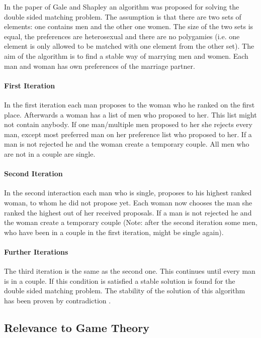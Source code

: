 In the paper of Gale and Shapley \cite{gale62a} an algorithm was proposed for solving the double sided matching problem.
The assumption is that there are two sets of elements: one contains men and the other one women.
The size of the two sets is equal, the preferences are heterosexual and there are no polygamies (i.e. one element is only allowed to be matched with one element from the other set).
The aim of the algorithm is to find a stable way of marrying men and women.
Each man and woman has own preferences of the marriage partner.

\paragraph{First Iteration\\}
In the first iteration each man proposes to the woman who he ranked on the first place.
Afterwards a woman has a list of men who proposed to her. This list might not contain anybody. 
If one man/multiple men proposed to her she rejects every man, except most preferred man on her preference list who proposed to her.
If a man is not rejected he and the woman create a temporary couple.
All men who are not in a couple are single.

\paragraph{Second Iteration\\}
In the second interaction each man who is single, proposes to his highest ranked woman, to whom he did not propose yet.
Each woman now chooses the man she ranked the highest out of her received proposals.
If a man is not rejected he and the woman create a temporary couple (Note: after the second iteration some men, who have been in a couple in the first iteration, might be single again).

\paragraph{Further Iterations\\}
The third iteration is the same as the second one.
This continues until every man is in a couple.
If this condition is satisfied a stable solution is found for the double sided matching problem.
The stability of the solution of this algorithm has been proven by contradiction \cite{gale62a}.

\subsection{Relevance to Game Theory}

